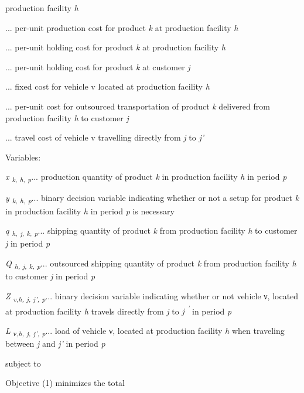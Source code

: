  production facility \textit{h}\par  ... per-unit production cost for product \textit{k
 } at production facility \textit{h}\par  ... per-unit holding cost for product \textit{k
 } at production facility \textit{h}\par  ... per-unit holding cost for product \textit{k
 } at customer \textit{j}\par  ... fixed cost for vehicle v located at production
 facility \textit{h}\par  ... per-unit cost for outsourced transportation of
 product \textit{k} delivered from production facility \textit{h} to
 customer \textit{j}\par  ... travel cost of vehicle v travelling directly from
 \textit{j} to \textit{j'}\par Variables:\par \textit{x \textsubscript{k, h, p}}... production quantity of product \textit{k
 } in production facility \textit{h} in period \textit{p}\par \textit{y \textsubscript{k, h, p}}... binary decision variable indicating whether
 or not a setup for product \textit{k} in production facility \textit{h
 } in period \textit{p} is necessary\par \textit{q \textsubscript{h, j, k, p}}... shipping quantity of product \textit{k
 } from production facility \textit{h} to customer \textit{j
 } in period \textit{p}\par \textit{Q \textsubscript{h, j, k, p}}... outsourced shipping quantity of product
 \textit{k} from production facility \textit{h} to customer
 \textit{j} in period \textit{p}\par \textit{Z \textsubscript{v,h, j, j', p}}... binary decision variable indicating
 whether or not vehicle ν, located at production facility \textit{h} travels
 directly from \textit{j} to \textit{j \textsuperscript{'}} in period
 \textit{p}\par \textit{L \textsubscript{ν,h, j, j', p}}... load of vehicle ν, located at
 production facility \textit{h} when traveling between \textit{j} and
 \textit{j'} in period \textit{p}\par subject to\par Objective (1) minimizes the total
